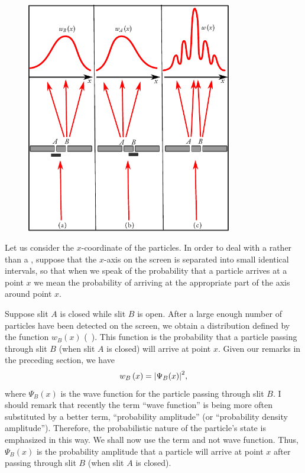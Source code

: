 \begin{figure}[!ht]
\centering
\includegraphics[width=0.8\textwidth]{figures/interference.pdf}
\end{figure}
Let us consider the $x$-coordinate of the particles. In order to deal with a  rather than a , suppose that the $x$-axis on the screen is separated into small identical intervals, so that when we speak of the probability that a particle arrives at a point $x$ we mean the probability of arriving at the appropriate part of the axis around point $x$.

Suppose slit $A$ is closed while slit $B$ is open. After a large enough
number of particles have been detected on the screen, we obtain
a distribution defined by the function $w_{B} (x)$ (~). This function is the probability that a particle passing through slit $B$ (when slit $A$ is closed) will arrive at point $x$. Given our remarks in the preceding section, we have
\begin{equation}%
w_{B} \, (x) = \abs{\Psi_{B} (x)}^{2},
\label{eq-5.5}
\end{equation}
where $\Psi_{B}(x)$ is the wave function for the particle passing through slit $B$. I should remark that recently the term ``wave function'' is being more
often substituted by a better term, ``probability amplitude'' (or ``probability density amplitude''). Therefore, the probabilistic nature of
the particle's state is emphasized in this way. We shall now use the term
 and not wave function. Thus,  $\Psi_{B}(x)$ is the probability amplitude that a particle will arrive at point $x$ after passing
through slit $B$ (when slit $A$ is closed).

